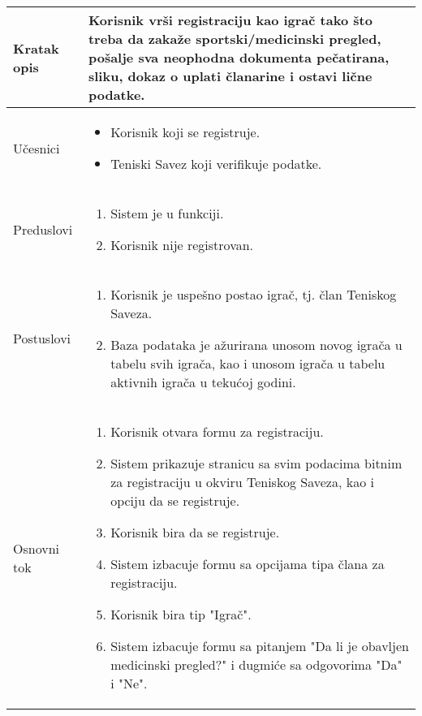 \documentclass{article}
\begin{document}
        \begin{longtable}{| p{} | p{} |} 
            \hline
                Kratak opis & Korisnik vrši registraciju kao igrač tako što treba da zakaže sportski/medicinski pregled, pošalje sva neophodna dokumenta pečatirana, sliku, dokaz o uplati članarine i ostavi lične podatke.\\ 
            \hline    
                Učesnici & \begin{itemize}
                    \item Korisnik koji se registruje.
                    \item Teniski Savez koji verifikuje podatke.
                \end{itemize} \\
            \hline
               Preduslovi & \begin{enumerate}
                   \item Sistem je u funkciji.
                   \item Korisnik nije registrovan.
               \end{enumerate}\\
            \hline  
                Postuslovi & \begin{enumerate}
                    \item Korisnik je uspešno postao igrač, tj. član Teniskog Saveza.
                    \item Baza podataka je ažurirana unosom novog igrača u tabelu svih igrača, kao i unosom igrača u tabelu aktivnih igrača u tekućoj godini.
                \end{enumerate}\\
            \hline
                Osnovni tok & \begin{enumerate}
                    \item Korisnik otvara formu za registraciju.
                    \item Sistem prikazuje stranicu sa svim podacima bitnim za registraciju u okviru Teniskog Saveza, kao i opciju da se registruje.
                    \item Korisnik bira da se registruje.
                    \item Sistem izbacuje formu sa opcijama tipa člana za registraciju.
                    \item Korisnik bira tip "Igrač".
                    \item Sistem izbacuje formu sa pitanjem "Da li je obavljen medicinski pregled?" i dugmiće sa odgovorima "Da" i "Ne".

\end{enumerate}
\end{longtable}
\end{document}
